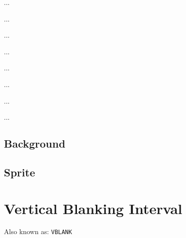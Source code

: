  ... 

 ... 

 ... 

 ... 

 ... 

 ... 

 ... 

 ... 

\subsection{Background}

\subsection{Sprite}

\section{Vertical Blanking Interval}

Also known as: \texttt{VBLANK}
